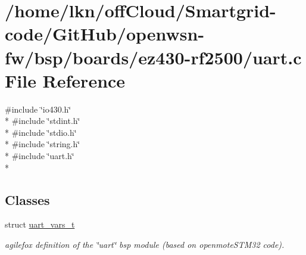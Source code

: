 \hypertarget{ez430-rf2500_2uart_8c}{}\section{/home/lkn/off\+Cloud/\+Smartgrid-\/code/\+Git\+Hub/openwsn-\/fw/bsp/boards/ez430-\/rf2500/uart.c File Reference}
\label{ez430-rf2500_2uart_8c}
{\ttfamily \#include \char`\"{}io430.\+h\char`\"{}}\\*
{\ttfamily \#include \char`\"{}stdint.\+h\char`\"{}}\\*
{\ttfamily \#include \char`\"{}stdio.\+h\char`\"{}}\\*
{\ttfamily \#include \char`\"{}string.\+h\char`\"{}}\\*
{\ttfamily \#include \char`\"{}uart.\+h\char`\"{}}\\*
\subsection*{Classes}
\begin{DoxyCompactItemize}
\item 
struct \hyperlink{structuart__vars__t}{uart\+\_\+vars\+\_\+t}
\begin{DoxyCompactList}\small\item\em agilefox definition of the \char`\"{}uart\char`\"{} bsp module (based on openmote\+S\+T\+M32 code). \end{DoxyCompactList}\end{DoxyCompactItemize}
